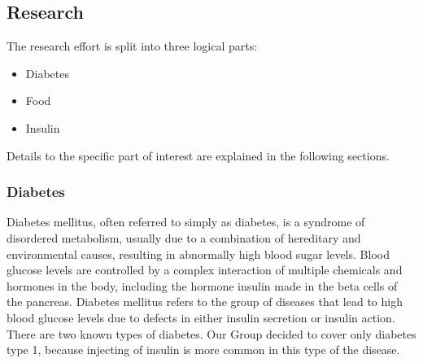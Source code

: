 \documentclass[pdflatex,a4paper,11pt,english]{scrreprt}
\begin{document}
\subsection{Research}
The research effort is split into three logical parts:
\begin{itemize}
  \item Diabetes
  \item Food
  \item Insulin
\end{itemize}
Details to the specific part of interest are explained in the following sections.

\subsubsection{Diabetes}
Diabetes mellitus, often referred to simply as diabetes, is a syndrome of disordered metabolism, usually due to a combination of hereditary and environmental causes, resulting in abnormally high blood sugar levels. 
Blood glucose levels are controlled by a complex interaction of multiple chemicals and hormones in the body, including the hormone insulin made in the beta cells of the pancreas. Diabetes mellitus refers to the group of diseases that lead to high blood glucose levels due to defects in either insulin secretion or insulin action.
\\
There are two known types of diabetes. Our Group decided to cover only diabetes type 1, because injecting of insulin is more common in this type of the disease.
\end{document}
